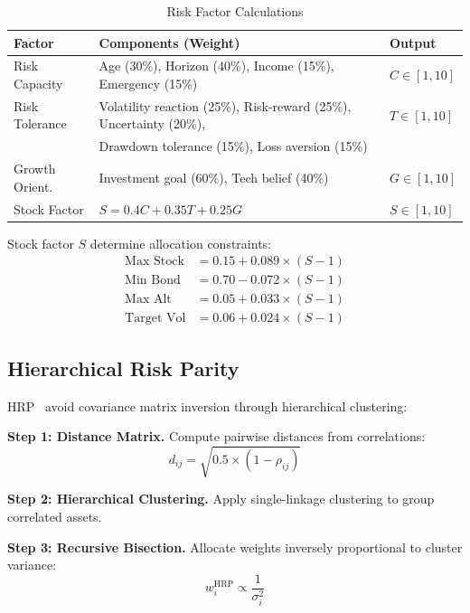 \documentclass[11pt]{article}
\begin{document}
\begin{table}[H]
\centering
\caption{Risk Factor Calculations}
\label{tab:risk-weights}
\small
\begin{tabular}{lll}
\toprule
\textbf{Factor} & \textbf{Components (Weight)} & \textbf{Output} \\
\midrule
Risk Capacity & Age (30\%), Horizon (40\%), Income (15\%), Emergency (15\%) & $C \in [1,10]$ \\
Risk Tolerance & Volatility reaction (25\%), Risk-reward (25\%), Uncertainty (20\%), & $T \in [1,10]$ \\
& Drawdown tolerance (15\%), Loss aversion (15\%) & \\
Growth Orient. & Investment goal (60\%), Tech belief (40\%) & $G \in [1,10]$ \\
\midrule
Stock Factor & $S = 0.4C + 0.35T + 0.25G$ & $S \in [1,10]$ \\
\bottomrule
\end{tabular}
\end{table}

Stock factor $S$ determine allocation constraints:
\begin{align}
\text{Max Stock} &= 0.15 + 0.089 \times (S - 1) \\
\text{Min Bond} &= 0.70 - 0.072 \times (S - 1) \\
\text{Max Alt} &= 0.05 + 0.033 \times (S - 1) \\
\text{Target Vol} &= 0.06 + 0.024 \times (S - 1)
\end{align}

\subsection{Hierarchical Risk Parity}

HRP~\cite{hrp2016} avoid covariance matrix inversion through hierarchical clustering:

\textbf{Step 1: Distance Matrix.} Compute pairwise distances from correlations:
\begin{equation}
d_{ij} = \sqrt{0.5 \times (1 - \rho_{ij})}
\end{equation}

\textbf{Step 2: Hierarchical Clustering.} Apply single-linkage clustering to group correlated assets.

\textbf{Step 3: Recursive Bisection.} Allocate weights inversely proportional to cluster variance:
\begin{equation}
w_i^{\text{HRP}} \propto \frac{1}{\sigma_i^2}
\end{equation}
\end{document}
